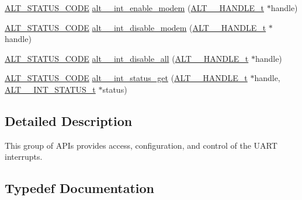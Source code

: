 \begin{DoxyCompactItemize}
\item 
\mbox{\hyperlink{hwlib_8h_abdb0d369f069723ca55d6c94bcaaaa12}{A\+L\+T\+\_\+\+S\+T\+A\+T\+U\+S\+\_\+\+C\+O\+DE}} \mbox{\hyperlink{group__UART__INT_ga5bd95b37d6c139f73c7644dc2c37f1a8}{alt\+\_\+\_\+int\+\_\+enable\+\_\+modem}} (\mbox{\hyperlink{group__UART__BASIC_ga4173f362f19fc04032c3859b78d78119}{A\+L\+T\+\_\+\_\+\+H\+A\+N\+D\+L\+E\+\_\+t}} $\ast$handle)
\item 
\mbox{\hyperlink{hwlib_8h_abdb0d369f069723ca55d6c94bcaaaa12}{A\+L\+T\+\_\+\+S\+T\+A\+T\+U\+S\+\_\+\+C\+O\+DE}} \mbox{\hyperlink{group__UART__INT_ga81cdcdc1193bb885af2b35f3c6917b60}{alt\+\_\+\_\+int\+\_\+disable\+\_\+modem}} (\mbox{\hyperlink{group__UART__BASIC_ga4173f362f19fc04032c3859b78d78119}{A\+L\+T\+\_\+\_\+\+H\+A\+N\+D\+L\+E\+\_\+t}} $\ast$handle)
\item 
\mbox{\hyperlink{hwlib_8h_abdb0d369f069723ca55d6c94bcaaaa12}{A\+L\+T\+\_\+\+S\+T\+A\+T\+U\+S\+\_\+\+C\+O\+DE}} \mbox{\hyperlink{group__UART__INT_ga436e9baa222073e5d8ba56922dfe2847}{alt\+\_\+\_\+int\+\_\+disable\+\_\+all}} (\mbox{\hyperlink{group__UART__BASIC_ga4173f362f19fc04032c3859b78d78119}{A\+L\+T\+\_\+\_\+\+H\+A\+N\+D\+L\+E\+\_\+t}} $\ast$handle)
\item 
\mbox{\hyperlink{hwlib_8h_abdb0d369f069723ca55d6c94bcaaaa12}{A\+L\+T\+\_\+\+S\+T\+A\+T\+U\+S\+\_\+\+C\+O\+DE}} \mbox{\hyperlink{group__UART__INT_gaa99e22c630fced1c320e4b53b763fdf0}{alt\+\_\+\_\+int\+\_\+status\+\_\+get}} (\mbox{\hyperlink{group__UART__BASIC_ga4173f362f19fc04032c3859b78d78119}{A\+L\+T\+\_\+\_\+\+H\+A\+N\+D\+L\+E\+\_\+t}} $\ast$handle, \mbox{\hyperlink{group__UART__INT_ga3112f458546736bbc043e8b00662855e}{A\+L\+T\+\_\+\_\+\+I\+N\+T\+\_\+\+S\+T\+A\+T\+U\+S\+\_\+t}} $\ast$status)
\end{DoxyCompactItemize}


\subsection{Detailed Description}
This group of A\+P\+Is provides access, configuration, and control of the U\+A\+RT interrupts. 

\subsection{Typedef Documentation}
\mbox{\label{group__UART__INT_ga3112f458546736bbc043e8b00662855e}} 
